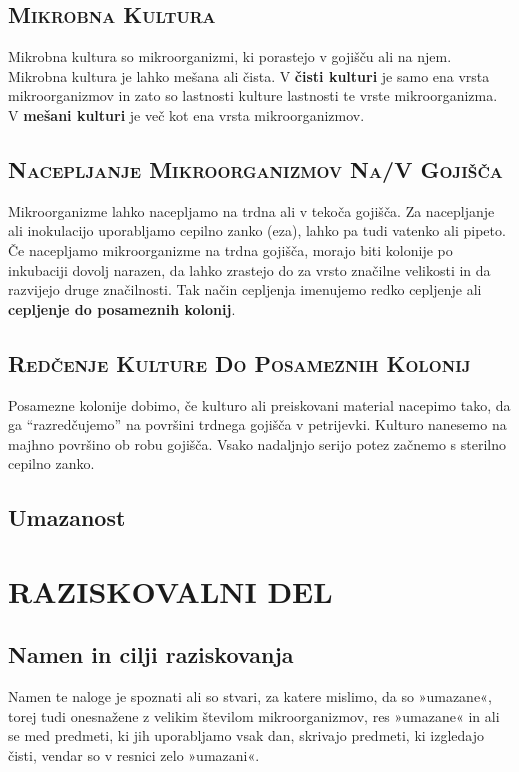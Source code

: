 \documentclass[12pt, a4paper, oneside]{report}
\begin{document}
\section{\textsc{Mikrobna Kultura}}

Mikrobna kultura so mikroorganizmi, ki porastejo v gojišču ali na njem. Mikrobna kultura je lahko mešana ali čista. V \textbf{čisti kulturi} je samo ena vrsta mikroorganizmov in zato so lastnosti kulture lastnosti te vrste mikroorganizma. V \textbf{mešani kulturi} je več kot ena vrsta mikroorganizmov.

\section{\textsc{Nacepljanje Mikroorganizmov Na/V Gojišča}}

Mikroorganizme lahko nacepljamo na trdna ali v tekoča gojišča. Za nacepljanje ali inokulacijo uporabljamo cepilno zanko (eza), lahko pa tudi vatenko ali pipeto. Če nacepljamo mikroorganizme na trdna gojišča, morajo biti kolonije po inkubaciji dovolj narazen, da lahko zrastejo do za vrsto značilne velikosti in da razvijejo druge značilnosti. Tak način cepljenja imenujemo redko cepljenje ali \textbf{cepljenje do posameznih kolonij}.

\section{\textsc{Redčenje Kulture Do Posameznih Kolonij}}

Posamezne kolonije dobimo, če kulturo ali preiskovani material nacepimo tako, da ga ``razredčujemo'' na površini trdnega gojišča v petrijevki. Kulturo nanesemo na majhno površino ob robu gojišča. Vsako nadaljnjo serijo potez začnemo s sterilno cepilno zanko.

\section{Umazanost}

\chapter{RAZISKOVALNI DEL}

\section{Namen in cilji raziskovanja}
Namen te naloge je spoznati ali so stvari, za katere mislimo, da so »umazane«, torej tudi onesnažene z velikim številom mikroorganizmov, res »umazane« in ali se med predmeti, ki jih uporabljamo vsak dan, skrivajo predmeti, ki izgledajo čisti, vendar so v resnici zelo »umazani«.
\end{document}
